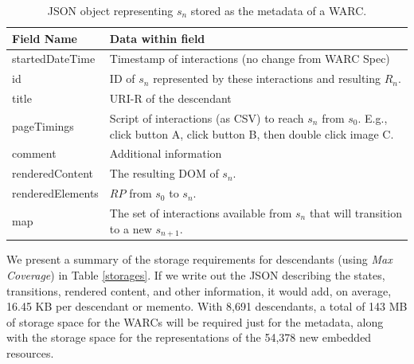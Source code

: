 \documentclass{sig-alternate}
\begin{document}
\begin{table}
\centering
\begin{tabular}{l | p{5cm}}
\textbf{Field Name} & \textbf{Data within field} \\
\hline
\hline
startedDateTime & Timestamp of interactions (no change from WARC Spec)\\
\hline
id & ID of $s_n$ represented by these interactions and resulting $R_n$.\\
\hline
title & URI-R of the descendant\\
\hline
pageTimings & Script of interactions (as CSV) to reach $s_n$ from $s_0$. E.g., click button A, click button B, then double click image C.\\
\hline
comment & Additional information \\
\hline
renderedContent & The resulting DOM of $s_n$.\\
\hline
renderedElements & $RP$ from $s_0$ to $s_n$.\\
\hline
map & The set of interactions available from $s_n$ that will transition to a new $s_{n+1}$.\\
\hline
\end{tabular}
  \caption{JSON object representing $s_n$ stored as the metadata of a WARC.}
  \label{fields}
\end{table}


We present a summary of the storage requirements for descendants (using \emph{Max Coverage}) in Table \ref{storages}. If we write out the JSON describing the states, transitions, rendered content, and other information, it would add, on average, 16.45 KB per descendant or memento. With 8,691 descendants, a total of 143 MB of storage space for the WARCs will be required just for the metadata, along with the storage space for the representations of the 54,378 new embedded resources. 
\end{document}
